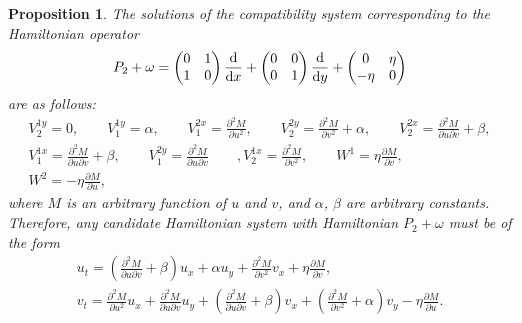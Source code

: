\documentclass[10pt,a4paper]{amsart}
\numberwithin{equation}{section}
\newtheorem{Proposition}[Theorem]{Proposition}
 { \theoremstyle{definition}
\newtheorem{Definition}[Theorem]{Definition}
\newtheorem{Note}[Theorem]{Note}
\newtheorem{Example}[Theorem]{Example}
\newtheorem{Remark}[Theorem]{Remark} }
\begin{document}
\begin{Proposition}\label{proposition4.3}
The solutions of the compatibility system corresponding to the Hamiltonian operator
\begin{gather*}
P_2+\omega=\begin{pmatrix} 0&1\\1&0\\ \end{pmatrix} \frac{\rm d}{{\rm d}x}+ \begin{pmatrix} 0&0\\0&1\\ \end{pmatrix} \frac{\rm d}{{\rm d}y}+\begin{pmatrix} 0&\eta\\-\eta&0\\ \end{pmatrix}
\end{gather*}
are as follows:
\begin{gather*}
 V^{1y}_2=0, \qquad V^{1y}_1=\alpha ,
 \qquad V^{2x}_1=\frac{\partial^2M}{\partial u^2} ,\qquad
 V^{2y}_2=\frac{\partial^2M}{\partial v^2}+\alpha, \qquad
 V^{2x}_2=\frac{\partial^2M}{\partial u \partial v}+\beta,\\ V^{1x}_1=\frac{\partial^2M}{\partial u \partial v}+\beta,\qquad
 V^{2y}_1=\frac{\partial^2M}{\partial u \partial v} \qquad, V^{1x}_2=\frac{\partial^2M}{\partial v^2}, \qquad
 W^1=\eta\frac{\partial M}{\partial v} ,
\\ W^2=-\eta\frac{\partial M}{\partial u} ,
\end{gather*}
where $M$ is an arbitrary function of $u$ and $v$, and $\alpha$, $\beta$ are arbitrary constants. Therefore, any candidate Hamiltonian system with Hamiltonian $P_2+\omega$ must be of the form
\begin{gather}
u_t=\left(\frac{\partial^2 M}{\partial u\partial v}+\beta\right)u_x+\alpha u_y+\frac{\partial^2 M}{\partial v^2}v_x+\eta\frac{\partial M}{\partial v},\nonumber\\
v_t=\frac{\partial^2 M}{\partial u^2}u_x+\frac{\partial^2 M}{\partial u\partial v}u_y+\left(\frac{\partial^2 M}{\partial u\partial v}+\beta\right)v_x+\left(\frac{\partial^2 M}{\partial v^2}+\alpha\right)v_y-\eta\frac{\partial M}{\partial u}.\label{eq:solcomp2}
\end{gather}
\end{Proposition}
\end{document}
